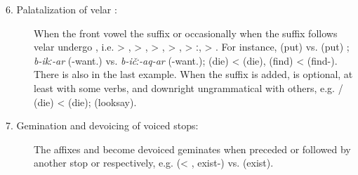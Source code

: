 \begin{description}
\item[6. Palatalization of velar :] When the front vowel  the  suffix  or occasionally when the  suffix  follows velar  undergo , i.e.  > , > ,  > ,  > ,  > ː,  > . For instance,  (put)  vs.  (put) ; \textit{b-ikː-ar} (-want.) vs. \textit{b-ičː-aq-ar} (-want.);  (die) <  (die),  (find) <  (find-). There is also  in the last example. When the  suffix is added,  is optional, at least with some verbs, and downright ungrammatical with others, e.g. \slash{} (die) <  (die);  (looksay).
\item[7. Gemination and devoicing of voiced stops:] The  affixes  and  become devoiced geminates when preceded or followed by another stop  or  respectively, e.g.  (< , exist-) vs.  (exist).

\end{description}
